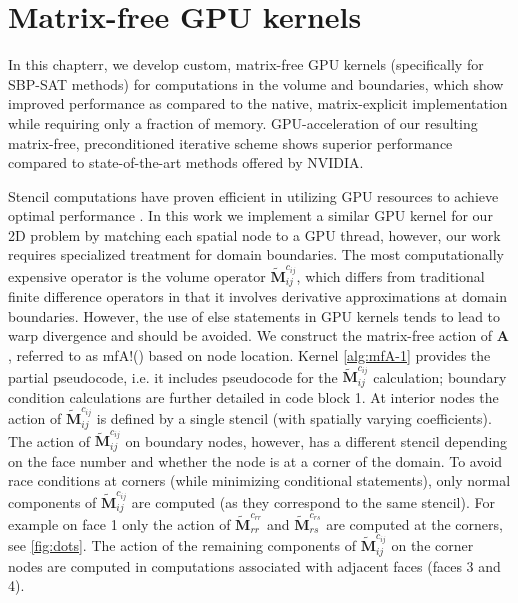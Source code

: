 \section{Matrix-free GPU kernels}
In this chapterr, we develop custom, matrix-free GPU kernels (specifically for SBP-SAT methods) for computations in the volume and boundaries, which show improved performance as compared to the native, matrix-explicit implementation while requiring only a fraction of memory. GPU-acceleration of our resulting matrix-free, preconditioned iterative scheme shows superior performance compared to state-of-the-art methods offered by NVIDIA.

Stencil computations have proven efficient in utilizing GPU resources to achieve optimal performance \citep{vizitiu2014optimized,krotkiewski2013efficient}. In this work we implement a similar GPU kernel for our 2D problem by matching each spatial node to a GPU thread, however, our work requires specialized treatment for domain boundaries. The most computationally expensive operator is the volume operator $\tilde{\boldsymbol{M}}^{c_{ij}}_{ij}$, which differs from traditional finite difference operators in that it involves derivative approximations at domain boundaries. However, the use of else statements in GPU kernels tends to lead to warp divergence and should be avoided. We construct the matrix-free action of $\boldsymbol{A}$, referred to as {\ttfamily mfA!}() based on node location. Kernel \autoref{alg:mfA-1} provides the partial pseudocode, i.e. it includes pseudocode for the $\tilde{\boldsymbol{M}}^{c_{ij}}_{ij}$ calculation; boundary condition calculations are further detailed in code block 1.  At interior nodes the action of $\tilde{\boldsymbol{M}}^{c_{ij}}_{ij}$ is defined by a single stencil (with spatially varying coefficients). The action of $\tilde{\boldsymbol{M}}^{c_{ij}}_{ij}$ on boundary nodes, however, has a different stencil depending on the face number and whether the node is at a corner of the domain. To avoid race conditions at corners (while minimizing conditional statements), only normal components of $\tilde{\boldsymbol{M}}^{c_{ij}}_{ij}$ are computed (as they correspond to the same stencil). For example on face 1 only the action of $\tilde{\boldsymbol{M}}^{c_{rr}}_{rr}$ and $\tilde{\boldsymbol{M}}^{c_{rs}}_{rs}$ are computed at the corners, see \autoref{fig:dots}. The action of the remaining components of $\tilde{\boldsymbol{M}}^{c_{ij}}_{ij}$ on the corner nodes are computed in computations associated with adjacent faces (faces 3 and 4). 

